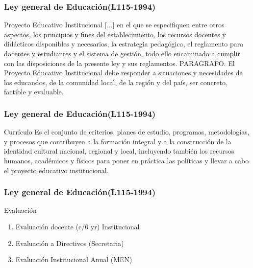 \documentclass{beamer}
\begin{document}
\begin{frame}
\frametitle{Ley general de Educaci\'on(L115-1994)}
\begin{block}{Proyecto Educativo Institucional }
[...] en el que se especifiquen entre otros aspectos, los principios y fines del establecimiento, los recursos docentes y did\'acticos  disponibles y necesarios, la estrategia pedag\'ogica, el reglamento para docentes y estudiantes y el sistema de gesti\'on, todo ello encaminado a cumplir con las disposiciones de la presente ley y sus reglamentos. \newline
[...]
\newline
PARAGRAFO. El Proyecto Educativo Institucional debe responder a situaciones y necesidades de los educandos, de la comunidad local, de la regi\'on y del pa\'is, ser concreto, factible y evaluable.
\end{block}
\end{frame}

\begin{frame}
\frametitle{Ley general de Educaci\'on(L115-1994)}
\begin{block}{Curr\'iculo}
Es el conjunto de criterios, planes de estudio, programas, metodolog\'ias, y procesos que contribuyen a la formaci\'on integral y a la construcci\'on de la identidad cultural nacional, regional y local, incluyendo tambi\'en los recursos humanos, acad\'emicos y f\'isicos para poner en pr\'actica las pol\'iticas y llevar a cabo el proyecto educativo institucional.
\end{block}
\end{frame}

\begin{frame}
\frametitle{Ley general de Educaci\'on(L115-1994)}
\begin{block}{Evaluaci\'on}
\begin{enumerate}
\item Evaluaci\'on docente (c/6 yr) Institucional
\item Evaluaci\'on a Directivos (Secretaria)
\item Evaluaci\'on Institucional Anual (MEN)
\end{enumerate}
\end{block}
\end{frame}
\end{document}
